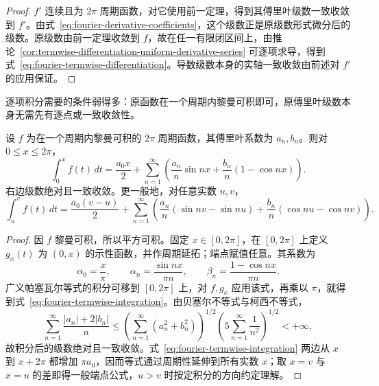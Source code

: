 \documentclass[UTF8,12pt,a4paper,fontset=fandol]{ctexbook}
\begin{document}
\begin{proof}
$f'$ 连续且为 $2\pi$ 周期函数，对它使用前一定理，得到其傅里叶级数一致收敛到 $f'$。由式~\eqref{eq:fourier-derivative-coefficients}，这个级数正是原级数形式微分后的级数。原级数由前一定理收敛到 $f$，故在任一有限闭区间上，由推论~\ref{cor:termwise-differentiation-uniform-derivative-series} 可逐项求导，得到式~\eqref{eq:fourier-termwise-differentiation}。导数级数本身的实轴一致收敛由前述对 $f'$ 的应用保证。
\end{proof}

逐项积分需要的条件弱得多：原函数在一个周期内黎曼可积即可，原傅里叶级数本身无需先有逐点或一致收敛性。

\begin{theorem}[傅里叶级数的逐项积分]
\label{thm:fourier-termwise-integration}
设 $f$ 为在一个周期内黎曼可积的 $2\pi$ 周期函数，其傅里叶系数为 $a_n,b_n$。则对 $0\leq x\leq2\pi$，
\begin{equation}
    \int_0^xf(t)\,dt=\frac{a_0x}{2}
       +\sum_{n=1}^\infty
          \left(\frac{a_n}{n}\sin nx
                  +\frac{b_n}{n}(1-\cos nx)\right).
    \label{eq:fourier-termwise-integration}
\end{equation}
右边级数绝对且一致收敛。更一般地，对任意实数 $u,v$，
\begin{equation}
    \int_u^vf(t)\,dt=\frac{a_0(v-u)}2
       +\sum_{n=1}^\infty\left(
          \frac{a_n}{n}(\sin nv-\sin nu)
           +\frac{b_n}{n}(\cos nu-\cos nv)\right).
    \label{eq:fourier-integral-arbitrary-endpoints}
\end{equation}
\end{theorem}

\begin{proof}
因 $f$ 黎曼可积，所以平方可积。固定 $x\in[0,2\pi]$，在 $[0,2\pi]$ 上定义 $g_x(t)$ 为 $(0,x)$ 的示性函数，并作周期延拓；端点赋值任意。其系数为
\[
    \alpha_0=\frac x\pi,\qquad
    \alpha_n=\frac{\sin nx}{\pi n},\qquad
    \beta_n=\frac{1-\cos nx}{\pi n}.
\]
广义帕塞瓦尔等式的积分可移到 $[0,2\pi]$ 上，对 $f,g_x$ 应用该式，再乘以 $\pi$，就得到式~\eqref{eq:fourier-termwise-integration}。由贝塞尔不等式与柯西不等式，
\[
    \sum_{n=1}^\infty\frac{|a_n|+2|b_n|}{n}
       \leq\left(\sum_{n=1}^\infty(a_n^2+b_n^2)\right)^{1/2}
           \left(5\sum_{n=1}^\infty\frac1{n^2}\right)^{1/2}<+\infty,
\]
故积分后的级数绝对且一致收敛。式~\eqref{eq:fourier-termwise-integration} 两边从 $x$ 到 $x+2\pi$ 都增加 $\pi a_0$，因而等式通过周期性延伸到所有实数 $x$；取 $x=v$ 与 $x=u$ 的差即得一般端点公式，$u>v$ 时按定积分的方向约定理解。
\end{proof}
\end{document}
